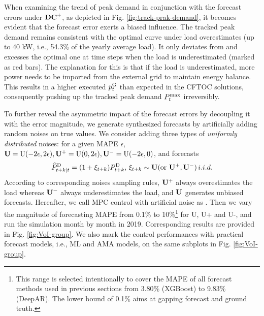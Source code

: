 When examining the trend of peak demand in conjunction with the forecast errors under $\mathbf{{DC}^{+}}$, as depicted in Fig. \ref{fig:track-prak-demand}, it becomes evident that the forecast error exerts a biased influence. The tracked peak demand remains consistent with the optimal curve under load overestimates (up to 40 kW, i.e., 54.3\% of the yearly average load). It only deviates from and excesses the optimal one at time steps when the load is underestimated (marked as red bars). The explanation for this is that if the load is underestimated, more power needs to be imported from the external grid to maintain energy balance. This results in a higher executed $p^{\text{G}}_t$ than expected in the CFTOC solutions, consequently pushing up the tracked peak demand $P^{\max}_t$ irreversibly. 

To further reveal the asymmetric impact of the forecast errors by decoupling it with the error magnitude, we generate synthesized forecasts by artificially adding random noises on true values. We consider adding three types of \emph{uniformly distributed} noises: for a given MAPE $\epsilon$, $\mathbf{U} = \text{U}(-2\epsilon, 2\epsilon), \mathbf{U^+} = \text{U}(0, 2\epsilon), \mathbf{U^-} = \text{U}(-2\epsilon, 0)$, and forecasts
\begin{equation}
    \widehat{P}^\text{D}_{t+k \mid t} = (1+\xi_{t+k}) P^\text{D}_{t+k},\, \xi_{t+k} \sim \mathbf{U} (\text{or }\mathbf{U^+}, \mathbf{U^-}) \,i.i.d. 
\end{equation}
According to corresponding noises sampling rules, $\mathbf{U^+}$ always overestimates the load whereas $\mathbf{U^-}$ always underestimates the load, and $\mathbf{U}$ generates unbiased forecasts.
Hereafter, we call MPC control with artificial noise as \MPCe. Then we vary the magnitude of forecasting MAPE from 0.1\% to 10\%\footnote{This range is selected intentionally to cover the MAPE of all forecast methods used in previous sections from 3.80\% (XGBoost) to 9.83\% (DeepAR). The lower bound of 0.1\% aims at gapping forecast and ground truth.} for U, U+ and U-, and run the simulation month by month in 2019. Corresponding results are provided in Fig. \ref{fig:VoI-group}. We also mark the control performances with practical forecast models, i.e., ML and AMA models, on the same subplots in Fig. \ref{fig:VoI-group}.




